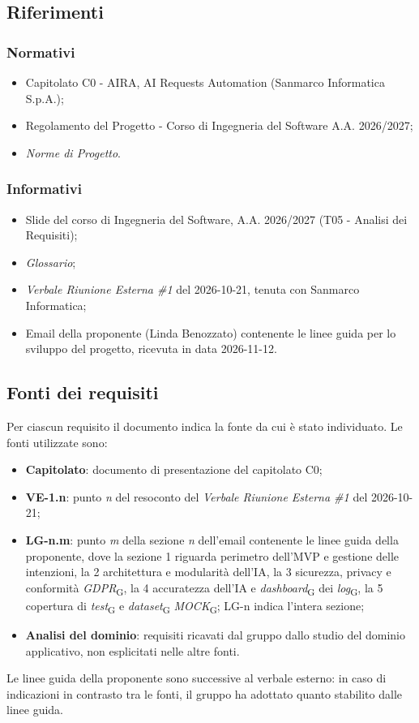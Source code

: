 \subsection{Riferimenti}
\subsubsection{Normativi}
	\begin{itemize}
		\item Capitolato C0 - AIRA, AI Requests Automation (Sanmarco Informatica S.p.A.);
		\item Regolamento del Progetto - Corso di Ingegneria del Software A.A. 2026/2027;
		\item \textit{Norme di Progetto}.
	\end{itemize}

\subsubsection{Informativi}
	\begin{itemize}
		\item Slide del corso di Ingegneria del Software, A.A. 2026/2027 (T05 - Analisi dei Requisiti);
		\item \textit{Glossario};
		\item \textit{Verbale Riunione Esterna \#1} del 2026-10-21, tenuta con Sanmarco Informatica;
		\item Email della proponente (Linda Benozzato) contenente le linee guida per lo sviluppo del progetto, ricevuta in data 2026-11-12.
	\end{itemize}

\subsection{Fonti dei requisiti}
Per ciascun requisito il documento indica la fonte da cui è stato individuato. Le fonti utilizzate sono:
	\begin{itemize}
		\item \textbf{Capitolato}: documento di presentazione del capitolato C0;
		\item \textbf{VE-1.n}: punto \textit{n} del resoconto del \textit{Verbale Riunione Esterna \#1} del 2026-10-21;
		\item \textbf{LG-n.m}: punto \textit{m} della sezione \textit{n} dell'email contenente le linee guida della proponente, dove la sezione 1 riguarda perimetro dell'MVP e gestione delle intenzioni, la 2 architettura e modularità dell'IA, la 3 sicurezza, privacy e conformità \textit{GDPR}\textsubscript{G}, la 4 accuratezza dell'IA e \textit{dashboard}\textsubscript{G} dei \textit{log}\textsubscript{G}, la 5 copertura di \textit{test}\textsubscript{G} e \textit{dataset}\textsubscript{G} \textit{MOCK}\textsubscript{G}; LG-n indica l'intera sezione;
		\item \textbf{Analisi del dominio}: requisiti ricavati dal gruppo dallo studio del dominio applicativo, non esplicitati nelle altre fonti.
	\end{itemize}
Le linee guida della proponente sono successive al verbale esterno: in caso di indicazioni in contrasto tra le fonti, il gruppo ha adottato quanto stabilito dalle linee guida.
